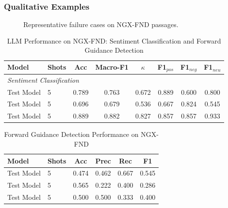 \subsubsection*{Qualitative Examples}

\begin{figure}[h]
\centering
{}
\caption{Representative failure cases on NGX-FND passages.}
\label{fig:error_examples}
\end{figure}



\begin{table}[h]
\centering
\caption{LLM Performance on NGX-FND: Sentiment Classification and Forward Guidance Detection}
\label{tab:main_results}
\setlength{\tabcolsep}{6pt}
\begin{tabular}{llcccccc}
\hline
\textbf{Model} & \textbf{Shots} & \textbf{Acc} & \textbf{Macro-F1} & \textbf{$\kappa$} & \textbf{F1$_{pos}$} & \textbf{F1$_{neg}$} & \textbf{F1$_{neu}$} \\
\hline
\multicolumn{8}{l}{\textit{Sentiment Classification}} \\
Test Model           & 5 & 0.789 & 0.763 & 0.672 & 0.889 & 0.600 & 0.800 \\
Test Model           & 5 & 0.696 & 0.679 & 0.536 & 0.667 & 0.824 & 0.545 \\
Test Model           & 5 & 0.889 & 0.882 & 0.827 & 0.857 & 0.857 & 0.933 \\
\hline
\end{tabular}
\end{table}



\begin{table}[h]
\centering
\caption{Forward Guidance Detection Performance on NGX-FND}
\label{tab:guidance_results}
\begin{tabular}{llcccc}
\hline
\textbf{Model} & \textbf{Shots} & \textbf{Acc} & \textbf{Prec} & \textbf{Rec} & \textbf{F1} \\
\hline
Test Model           & 5 & 0.474 & 0.462 & 0.667 & 0.545 \\
Test Model           & 5 & 0.565 & 0.222 & 0.400 & 0.286 \\
Test Model           & 5 & 0.500 & 0.500 & 0.333 & 0.400 \\
\hline
\end{tabular}
\end{table}

